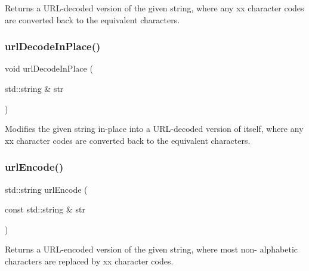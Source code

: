 Returns a U\+R\+L-\/decoded version of the given string, where any xx character codes are converted back to the equivalent characters. 

\mbox{\label{namespacesgl_1_1priv_1_1strlib_a18179778100838daa81655bf9a912e9e}} 
\subsubsection{\texorpdfstring{url\+Decode\+In\+Place()}{urlDecodeInPlace()}}
{\footnotesize\ttfamily void url\+Decode\+In\+Place (\begin{DoxyParamCaption}\item[{std\+::string \&}]{str }\end{DoxyParamCaption})}



Modifies the given string in-\/place into a U\+R\+L-\/decoded version of itself, where any xx character codes are converted back to the equivalent characters. 

\mbox{\label{namespacesgl_1_1priv_1_1strlib_aee15f17b2470cc3e874de693b091e702}} 
\subsubsection{\texorpdfstring{url\+Encode()}{urlEncode()}}
{\footnotesize\ttfamily std\+::string url\+Encode (\begin{DoxyParamCaption}\item[{const std\+::string \&}]{str }\end{DoxyParamCaption})}



Returns a U\+R\+L-\/encoded version of the given string, where most non-\/ alphabetic characters are replaced by xx character codes. 

\mbox{\label{namespacesgl_1_1priv_1_1strlib_a0d795c9b0ee3f6a80517e290da8f16d4}} 
